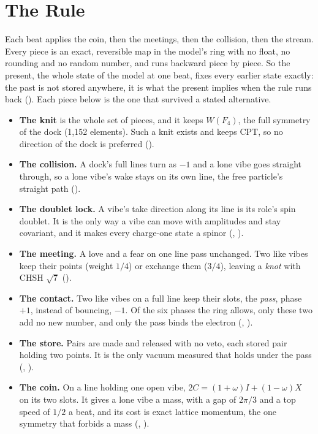 \section{The Rule}
\label{sec:rule}

Each beat applies the coin, then the meetings, then the collision, then the stream. Every piece is an exact,
reversible map in the model's ring with no float, no rounding and no random number, and runs backward piece
by piece. So the present, the whole state of the model at one beat, fixes every earlier state exactly: the past is
not stored anywhere, it is what the present implies when the rule runs back (). Each piece below is
the one that survived a stated alternative.

\begin{itemize}
\item \textbf{The knit} is the whole set of pieces, and it keeps $W(F_4)$, the full symmetry of the dock (1,152
elements). Such a knit exists and keeps CPT, so no direction of the dock is preferred ().
\item \textbf{The collision.} A dock's full lines turn as $-1$ and a lone vibe goes straight through, so a lone
vibe's wake stays on its own line, the free particle's straight path ().
\item \textbf{The doublet lock.} A vibe's take direction along its line is its role's spin doublet. It is the only
way a vibe can move with amplitudes and stay covariant, and it makes every charge-one state a spinor
(, ).
\item \textbf{The meeting.} A love and a fear on one line pass unchanged. Two like vibes keep their points (weight
$1/4$) or exchange them ($3/4$), leaving a \emph{knot} with CHSH $\sqrt7$ ().
\item \textbf{The contact.} Two like vibes on a full line keep their slots, the \emph{pass}, phase $+1$, instead of
bouncing, $-1$. Of the six phases the ring allows, only these two add no new number, and only the pass binds the
electron (, ).
\item \textbf{The store.} Pairs are made and released with no veto, each stored pair holding two points. It is the
only vacuum measured that holds under the pass (, ).
\item \textbf{The coin.} On a line holding one open vibe, $2C = (1 + \omega) I + (1 - \omega) X$ on its two slots.
It gives a lone vibe a mass, with a gap of $2\pi/3$ and a top speed of $1/2$ a beat, and its cost is exact lattice
momentum, the one symmetry that forbids a mass (, ).
\end{itemize}


